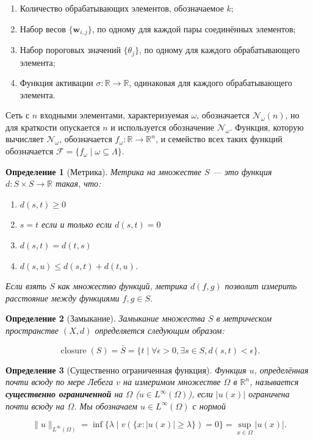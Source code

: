 \documentclass[12pt]{article}
\newtheorem{definition}{Определение}
\begin{document}
	\begin{enumerate}
		\item Количество обрабатывающих элементов, обозначаемое $k$;
		\item Набор весов $\{\mathbf{w}_{i,j}\}$, по одному для каждой пары соединённых элементов;
		\item Набор пороговых значений $\{\theta_j\}$, по одному для каждого обрабатывающего элемента;
		\item Функция активации $\sigma: \mathbb{R} \to \mathbb{R}$, одинаковая для каждого обрабатывающего элемента.
	\end{enumerate}
	Сеть с $n$ входными элементами, характеризуемая $\omega$, обозначается $\mathcal{N}_\omega(n)$, но для краткости опускается $n$ и используется обозначение $\mathcal{N}_\omega$. Функция, которую вычисляет $\mathcal{N}_\omega$, обозначается $f_\omega: \mathbb{R} \to \mathbb{R}^n$, и семейство всех таких функций обозначается $\mathcal{F} = \{ f_\omega \mid \omega \subseteq \Lambda \}$.\begin{definition}[Метрика]
		Метрика на множестве $S$ — это функция $d: S \times S \to \mathbb{R}$ такая, что:
		
		\begin{enumerate}
			\item $d(s, t) \geq 0$
			\item $s = t$ если и только если $d(s, t) = 0$
			\item $d(s, t) = d(t, s)$
			\item $d(s, u) \leq d(s, t) + d(t, u)$.
		\end{enumerate}
		
		Если взять $S$ как множество функций, метрика $d(f, g)$ позволит измерить расстояние между функциями $f, g \in S$.
	\end{definition}
	
	\begin{definition}[Замыкание]
		Замыкание множества $S$ в метрическом пространстве $(X, d)$ определяется следующим образом:
		
		\[
		\operatorname{closure}(S) = \bar{S} = \{ t \mid \forall \epsilon > 0, \exists s \in S, d(s, t) < \epsilon \}.
		\]
	\end{definition}
	
	\begin{definition}[Существенно ограниченная функция]
		Функция $u$, определённая почти всюду по мере Лебега $v$ на измеримом множестве $\Omega$ в $\mathbb{R}^n$, называется \textbf{существенно ограниченной} на $\Omega$ ($u \in L^\infty(\Omega)$), если $|u(x)|$ ограничена почти всюду на $\Omega$. Мы обозначаем $u \in L^\infty(\Omega)$ с нормой
		
		\[
		\|u\|_{L^\infty(\Omega)} = \inf\{ \lambda \mid v(\{ x : |u(x)| \geq \lambda \}) = 0 \} = \sup_{x \in \Omega} |u(x)|.
		\]
	\end{definition}
	
\end{document}
